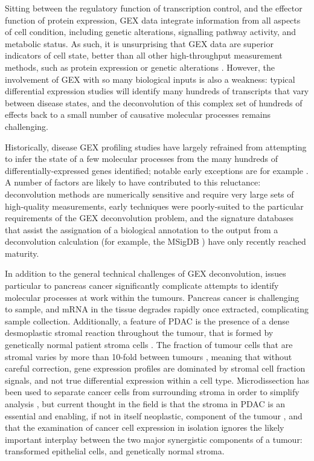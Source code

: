 \documentclass[dissertation.tex]{subfiles}
\begin{document}
Sitting between the regulatory function of transcription control, and the effector function of protein expression, \gls{GEX} data integrate information from all aspects of cell condition, including genetic alterations, signalling pathway activity, and metabolic status.  As such, it is unsurprising that \gls{GEX} data are superior indicators of cell state, better than all other high-throughput measurement methods, such as protein expression or genetic alterations \cite{Ray2014}.  However, the involvement of \gls{GEX} with so many biological inputs is also a weakness: typical differential expression studies will identify many hundreds of transcripts that vary between disease states, and the deconvolution of this complex set of hundreds of effects back to a small number of causative molecular processes remains challenging.

Historically, disease \gls{GEX} profiling studies have largely refrained from attempting to infer the state of a few molecular processes from the many hundreds of differentially-expressed genes identified; notable early exceptions are for example .  A number of factors are likely to have contributed to this reluctance: deconvolution methods are numerically sensitive and require very large sets of high-quality measurements, early techniques were poorly-suited to the particular requirements of the \gls{GEX} deconvolution problem, and the signature databases that assist the assignation of a biological annotation to the output from a deconvolution calculation (for example, the \acrshort{MSigDB} \cite{Subramanian2005}) have only recently reached maturity.

In addition to the general technical challenges of \gls{GEX} deconvolution, issues particular to pancreas cancer significantly complicate attempts to identify molecular processes at work within the tumours.  Pancreas cancer is challenging to sample, and mRNA in the tissue degrades rapidly once extracted, complicating sample collection.  Additionally, a feature of \gls{PDAC} is the presence of a dense desmoplastic stromal reaction throughout the tumour, that is formed by genetically normal patient stroma cells \cite{Mahadevan2007}.  The fraction of tumour cells that are stromal varies by more than 10-fold between tumours \cite{Biankin2012}, meaning that without careful correction, gene expression profiles are dominated by stromal cell fraction signals, and not true differential expression within a cell type.  Microdissection has been used to separate cancer cells from surrounding stroma in order to simplify analysis \cite{Collisson2011}, but current thought in the field is that the stroma in \gls{PDAC} is an essential and enabling, if not in itself neoplastic, component of the tumour \cite{Mahadevan2007}, and that the examination of cancer cell expression in isolation ignores the likely important interplay between the two major synergistic components of a tumour: transformed epithelial cells, and genetically normal stroma.
\end{document}
